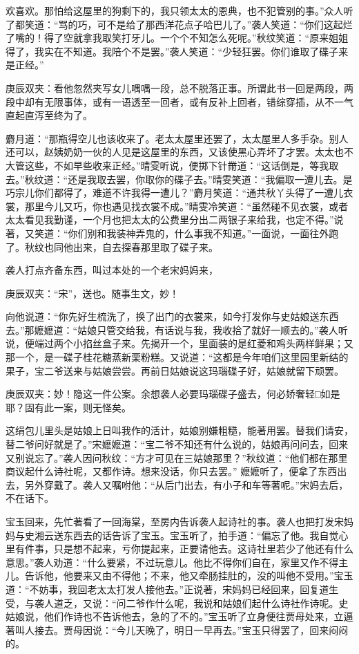 \begin{parag}
欢喜欢。那怕给这屋里的狗剩下的，我只领太太的恩典，也不犯管别的事。”众人听了都笑道：“骂的巧，可不是给了那西洋花点子哈巴儿了。”袭人笑道：“你们这起烂了嘴的！得了空就拿我取笑打牙儿。一个个不知怎么死呢。”秋纹笑道：“原来姐姐得了，我实在不知道。我陪个不是罢。”袭人笑道：“少轻狂罢。你们谁取了碟子来是正经。”\begin{note}庚辰双夹：看他忽然夹写女儿喁喁一段，总不脱落正事。所谓此书一回是两段，两段中却有无限事体，或有一语透至一回者，或有反补上回者，错综穿插，从不一气直起直泻至终为了。\end{note}麝月道：“那瓶得空儿也该收来了。老太太屋里还罢了，太太屋里人多手杂。别人还可以，赵姨奶奶一伙的人见是这屋里的东西，又该使黑心弄坏了才罢。太太也不大管这些，不如早些收来正经。”晴雯听说，便掷下针黹道：“这话倒是，等我取去。”秋纹道：“还是我取去罢，你取你的碟子去。”晴雯笑道：“我偏取一遭儿去。是巧宗儿你们都得了，难道不许我得一遭儿？”麝月笑道：“通共秋丫头得了一遭儿衣裳，那里今儿又巧，你也遇见找衣裳不成。”晴雯冷笑道：“虽然碰不见衣裳，或者太太看见我勤谨，一个月也把太太的公费里分出二两银子来给我，也定不得。”说著，又笑道：“你们别和我装神弄鬼的，什么事我不知道。”一面说，一面往外跑了。秋纹也同他出来，自去探春那里取了碟子来。
\end{parag}


\begin{parag}
    袭人打点齐备东西，叫过本处的一个老宋妈妈来，\begin{note}庚辰双夹：“宋”，送也。随事生文，妙！\end{note}向他说道：“你先好生梳洗了，换了出门的衣裳来，如今打发你与史姑娘送东西去。”那嬷嬷道：“姑娘只管交给我，有话说与我，我收拾了就好一顺去的。”袭人听说，便端过两个小掐丝盒子来。先揭开一个，里面装的是红菱和鸡头两样鲜果；又那一个，是一碟子桂花糖蒸新栗粉糕。又说道：“这都是今年咱们这里园里新结的果子，宝二爷送来与姑娘尝尝。再前日姑娘说这玛瑙碟子好，姑娘就留下顽罢。\begin{note}庚辰双夹：妙！隐这一件公案。余想袭人必要玛瑙碟子盛去，何必娇奢轻□如是耶？固有此一案，则无怪矣。\end{note}这绢包儿里头是姑娘上日叫我作的活计，姑娘别嫌粗糙，能著用罢。替我们请安，替二爷问好就是了。”宋嬷嬷道：“宝二爷不知还有什么说的，姑娘再问问去，回来又别说忘了。”袭人因问秋纹：“方才可见在三姑娘那里？”秋纹道：“他们都在那里商议起什么诗社呢，又都作诗。想来没话，你只去罢。” 嬷嬷听了，便拿了东西出去，另外穿戴了。袭人又嘱咐他：“从后门出去，有小子和车等著呢。”宋妈去后，不在话下。
\end{parag}


\begin{parag}
    宝玉回来，先忙著看了一回海棠，至房内告诉袭人起诗社的事。袭人也把打发宋妈妈与史湘云送东西去的话告诉了宝玉。宝玉听了，拍手道：“偏忘了他。我自觉心里有件事，只是想不起来，亏你提起来，正要请他去。这诗社里若少了他还有什么意思。”袭人劝道：“什么要紧，不过玩意儿。他比不得你们自在，家里又作不得主儿。告诉他，他要来又由不得他；不来，他又牵肠挂肚的，没的叫他不受用。”宝玉道：“不妨事，我回老太太打发人接他去。”正说著，宋妈妈已经回来，回复道生受，与袭人道乏，又说：“问二爷作什么呢，我说和姑娘们起什么诗社作诗呢。史姑娘说，他们作诗也不告诉他去，急的了不的。”宝玉听了立身便往贾母处来，立逼著叫人接去。贾母因说：“今儿天晚了，明日一早再去。”宝玉只得罢了，回来闷闷的。
\end{parag}


